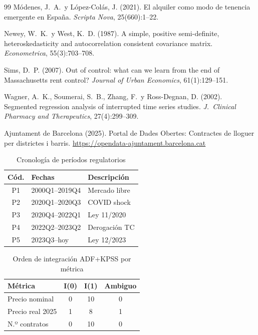 \documentclass[10pt,a4paper,twocolumn]{article}
\begin{document}
\begin{thebibliography}{99}
Módenes, J.~A.\ y López-Colás, J. (2021).
El alquiler como modo de tenencia emergente en España.
\textit{Scripta Nova}, 25(660):1--22.

Newey, W.~K.\ y West, K.~D. (1987).
A simple, positive semi-definite, heteroskedasticity and autocorrelation
consistent covariance matrix.
\textit{Econometrica}, 55(3):703--708.

Sims, D.~P. (2007).
Out of control: what can we learn from the end of Massachusetts rent control?
\textit{Journal of Urban Economics}, 61(1):129--151.

Wagner, A.~K., Soumerai, S.~B., Zhang, F.\ y Ross-Degnan, D. (2002).
Segmented regression analysis of interrupted time series studies.
\textit{J.\ Clinical Pharmacy and Therapeutics}, 27(4):299--309.

{Ajuntament de Barcelona} (2025).
Portal de Dades Obertes: Contractes de lloguer per districtes i barris.
\url{https://opendata-ajuntament.barcelona.cat}

\end{thebibliography}

\appendix

\begin{table}[H]
\caption{Cronología de períodos regulatorios}
\label{tab:periodos_app}
\centering\small
\begin{tabular}{cll}
\toprule
Cód. & Fechas & Descripción \\
\midrule
P1 & 2000Q1--2019Q4 & Mercado libre \\
P2 & 2020Q1--2020Q3 & COVID shock \\
P3 & 2020Q4--2022Q1 & Ley 11/2020 \\
P4 & 2022Q2--2023Q2 & Derogación TC \\
P5 & 2023Q3--hoy    & Ley 12/2023 \\
\bottomrule
\end{tabular}
\end{table}

\begin{table}[H]
\caption{Orden de integración ADF+KPSS por métrica}
\label{tab:stat_orden_app}
\centering\small
\begin{tabular}{lccc}
\toprule
Métrica & I(0) & I(1) & Ambiguo \\
\midrule
Precio nominal   & 0 & 10 & 0 \\
Precio real 2025 & 1 & 8  & 1 \\
N.º contratos    & 0 & 10 & 0 \\
\bottomrule
\end{tabular}
\end{table}
\end{document}

